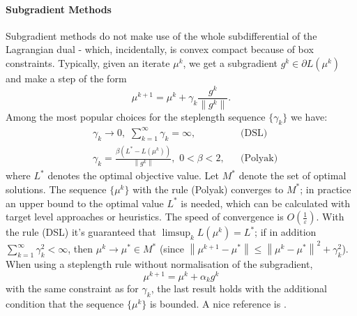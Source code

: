 \documentclass[10pt,twoside,book,a5paper]{ncc}
\begin{document}
\paragraph{Subgradient Methods}
Subgradient methods do not make use of the whole subdifferential of the Lagrangian dual - which, incidentally, is convex compact because of box constraints. Typically, given an iterate $\mu^k$, we get a subgradient $g^k \in \partial L(\mu^k)$ and make a step of the form
\[
    \mu^{k+1} = \mu^k + \gamma_k \frac{g^k}{\left\lVert g^k \right\rVert}.
\]
Among the most popular choices for the steplength sequence $\{\gamma_k\}$ we have:
\begin{align}
&\gamma_k \to 0, \,\, \sum_{k=1}^{\infty}\gamma_k = \infty, && \textrm{(DSL)} \\
&\gamma_k = \frac{\beta(L^* - L(\mu^k))}{\left\lVert g^k \right\rVert}, \,\, 0<\beta<2, && \textrm{(Polyak)}
\end{align}
where $L^*$ denotes the optimal objective value. Let $M^*$ denote the set of optimal solutions. \newline
The sequence $\{\mu^k\}$ with the rule (Polyak) converges to $M^*$; in practice an upper bound to the optimal value $L^*$ is needed, which can be calculated with target level approaches or heuristics. The speed of convergence is $O(\frac{1}{\varepsilon})$.
\newline
With the rule (DSL) it's guaranteed that $\limsup_k{L(\mu^k)} = L^*$; if in addition $\sum_{k=1}^{\infty}\gamma_k^2 < \infty$, then $\mu^k \to \mu^* \in M^*$ (since $\left\lVert\mu^{k+1}-\mu^*\right\rVert \le \left\lVert\mu^k-\mu^*\right\rVert^2 + \gamma_k^2$). When using a steplength rule without normalisation of the subgradient,
\[
\mu^{k+1} = \mu^{k}+\alpha_k g^k
\]
with the same constraint as for $\gamma_k$, the last result holds with the additional condition that the sequence $\{\mu^k\}$ is bounded. A nice reference is \cite{WellKnown}.
\end{document}
